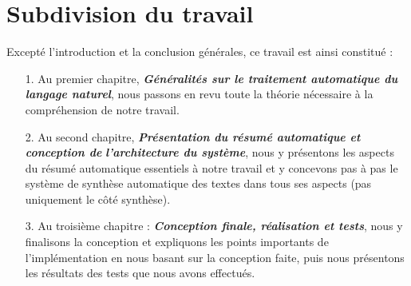\section{Subdivision du travail}
Excepté l'introduction et la conclusion générales, ce travail est ainsi constitué :
\begin{itemize}
\item[1.] Au premier chapitre, \textbf{\textit{Généralités sur le traitement automatique du langage naturel}}, nous passons en revu toute la théorie nécessaire à la compréhension de notre travail.
\item[2.] Au second chapitre, \textbf{\textit{Présentation du résumé automatique et conception de}} \textit{\textbf{l'archi\-tec\-ture du système}}, nous y présentons les aspects du résumé automatique essentiels à notre travail et y concevons pas à pas le système de synthèse automatique des textes dans tous ses aspects (pas uniquement le côté synthèse).
\item[3.] Au troisième chapitre : \textbf{\textit{Conception finale, réalisation et tests}}, nous y finalisons la conception et expliquons les points importants de l'implémentation en nous basant sur la conception faite, puis nous présentons les résultats des tests que nous avons effectués.
\end{itemize}